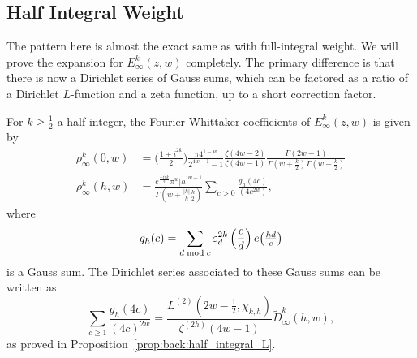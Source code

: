 \subsection{Half Integral Weight}\label{ssec:half_integral_eisenstein}

The pattern here is almost the exact same as with full-integral weight.
We will prove the expansion for $E_\infty^k(z,w)$ completely.
The primary difference is that there is now a Dirichlet series of Gauss sums, which can be
factored as a ratio of a Dirichlet $L$-function and a zeta function, up to a short
correction factor.

\begin{claim}
  For $k \geq \frac{1}{2}$ a half integer, the Fourier-Whittaker coefficients of $E_\infty^k(z,w)$ is given by
  \begin{align}
    \rho_\infty^k(0,w) &= \bigg( \frac{1+i^{2k}}{2} \bigg) \frac{\pi 4^{1-w}}{2^{4w - 1} - 1}
    \frac{\zeta(4w - 2)}{\zeta(4w - 1)}
    \frac{\Gamma(2w - 1)}{\Gamma(w + \frac{k}{2}) \Gamma(w - \frac{k}{2})}
    \\
    \rho_\infty^k(h,w) &= \frac{e^{\frac{-i\pi k}{2}} \pi^w \lvert h \rvert^{w-1}}
    {\Gamma(w + \frac{\lvert h \rvert}{h} \frac{k}{2})}
    \sum_{c > 0} \frac{g_h(4c)}{(4c^{2w})},
  \end{align}
  where
  \begin{equation}
    g_h(c) = \sum_{d \bmod c} \varepsilon_d^{2k} \left(\frac{c}{d}\right) e \big( \tfrac{hd}{c} \big)
  \end{equation}
  is a Gauss sum.
  The Dirichlet series associated to these Gauss sums can be written as
  \begin{equation}
    \sum_{c \geq 1} \frac{g_h(4c)}{(4c)^{2w}}
    =
    \frac{L^{(2)} (2w - \frac{1}{2}, \chi_{k,h})}{\zeta^{(2h)}(4w-1)}
    \widetilde{D}_\infty^k(h,w),
  \end{equation}
  as proved in Proposition~\ref{prop:back:half_integral_L}.
\end{claim}

